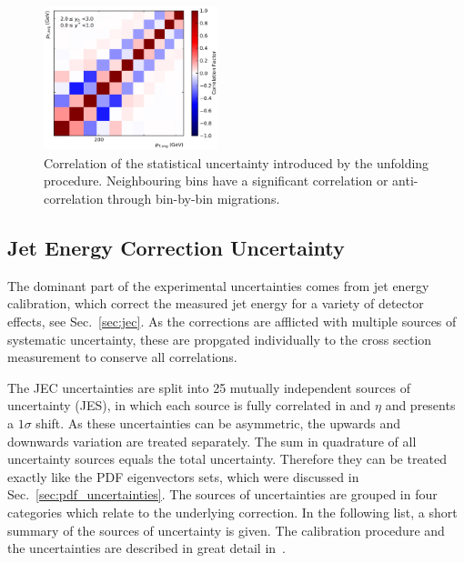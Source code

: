 \begin{figure}[htbp]
    \includegraphics[width=0.45\textwidth]{figures/measurement/unf_nlo_corr_yb2ys0.pdf}
    \caption[Correlations of statistical uncertainty]{Correlation of the
        statistical uncertainty introduced by the unfolding procedure.
        Neighbouring bins have a significant correlation or anti-correlation
        through bin-by-bin migrations.}
    \label{fig:corr_unfolding_nlo}
\end{figure}

\subsection{Jet Energy Correction Uncertainty}

The dominant part of the experimental uncertainties comes from jet energy
calibration, which correct the measured jet energy for a variety of detector
effects, see Sec.~\ref{sec:jec}. As the corrections are afflicted with multiple
sources of systematic uncertainty, these are propgated individually to the cross section
measurement to conserve all correlations.

The JEC uncertainties are split into 25 mutually independent sources of
uncertainty (JES), in which each source is fully correlated in \pt and $\eta$
and presents a $1\sigma$ shift. As these uncertainties can be asymmetric, the
upwards and downwards variation are treated separately. The sum in quadrature of
all uncertainty sources equals the total uncertainty. Therefore they can be
treated exactly like the PDF eigenvectors sets, which were discussed in
Sec.~\ref{sec:pdf_uncertainties}. The sources of uncertainties are grouped in
four categories which relate to the underlying correction. In the following
list, a short summary of the sources of uncertainty is given. The calibration
procedure and the uncertainties are described in great detail
in~\cite{jec_paper}.

